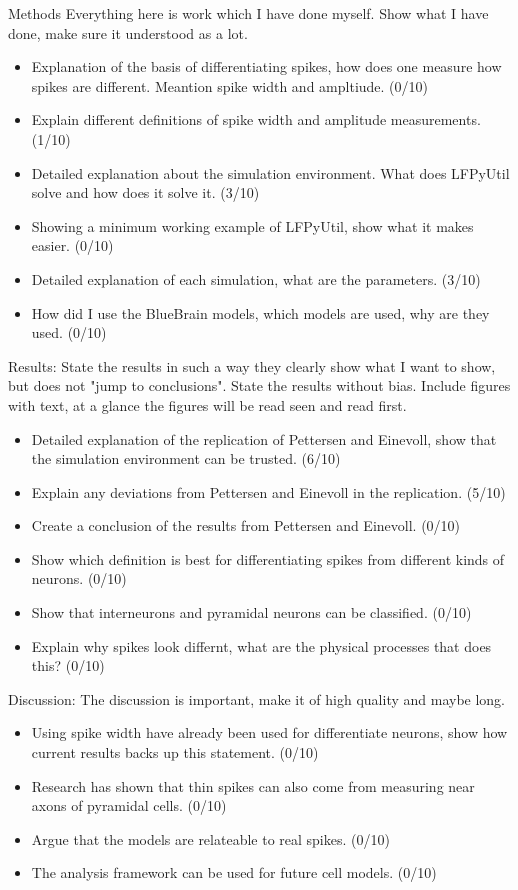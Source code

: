 \documentclass[altfont, fleqn]{uiophd}
\begin{document}
Methods
\newline
Everything here is work which I have done myself. Show what I have done, make sure
it understood as a lot.
\begin{itemize}
    \item Explanation of the basis of differentiating spikes, how does
        one measure how spikes are different. Meantion spike width and 
        ampltiude. (0/10)
    \item Explain different definitions of spike width and amplitude measurements. (1/10)
    \item Detailed explanation about the simulation environment. 
        What does LFPyUtil solve and how does it solve it. (3/10)
    \item Showing a minimum working example of LFPyUtil, show what it makes easier. (0/10)
    \item Detailed explanation of each simulation, what are the parameters. (3/10)
    \item How did I use the BlueBrain models, which models are used, why are they used. (0/10)
\end{itemize}

Results:
\newline
State the results in such a way they clearly show what I want to show, but
does not "jump to conclusions". State the results without bias.
Include figures with text, at a glance the figures will be read seen and read
first. 
\begin{itemize}
    \item Detailed explanation of the replication of Pettersen and Einevoll, show 
        that the simulation environment can be trusted. (6/10)
    \item Explain any deviations from Pettersen and Einevoll in the replication. (5/10)
    \item Create a conclusion of the results from Pettersen and Einevoll. (0/10)
    \item Show which definition is best for differentiating spikes from different
        kinds of neurons. (0/10)
    \item Show that interneurons and pyramidal neurons can be classified. (0/10)
    \item Explain why spikes look differnt, what are the physical processes that 
        does this? (0/10)
\end{itemize}

Discussion:
\newline
The discussion is important, make it of high quality and maybe long. 
\begin{itemize}
    \item Using spike width have already been used for differentiate neurons, 
        show how current results backs up this statement. (0/10)
    \item Research has shown that thin spikes can also come from measuring near
        axons of pyramidal cells. (0/10)
    \item Argue that the models are relateable to real spikes. (0/10)
    \item The analysis framework can be used for future cell models. (0/10)
\end{itemize}
\end{document}

